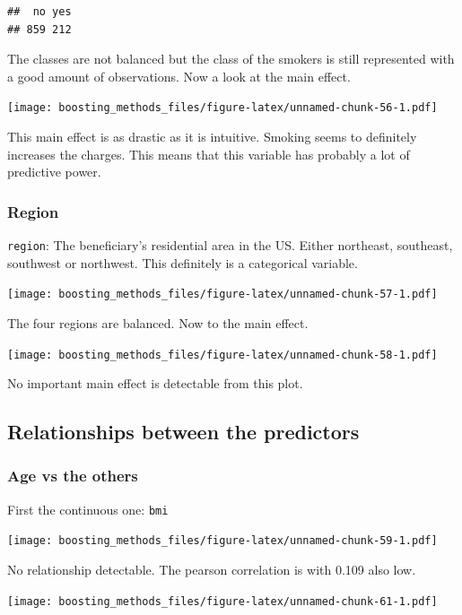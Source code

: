 \documentclass[
]{book}
\begin{document}
\begin{verbatim}
##  no yes 
## 859 212
\end{verbatim}

The classes are not balanced but the class of the smokers is still represented with a good amount of observations. Now a look at the main effect.

\texttt{[image: boosting\_methods\_files/figure-latex/unnamed-chunk-56-1.pdf]}

This main effect is as drastic as it is intuitive. Smoking seems to definitely increases the charges. This means that this variable has probably a lot of predictive power.

\hypertarget{region}{%
\subsubsection{Region}\label{region}}

\texttt{region}: The beneficiary's residential area in the US. Either northeast, southeast, southwest or northwest. This definitely is a categorical variable.

\texttt{[image: boosting\_methods\_files/figure-latex/unnamed-chunk-57-1.pdf]}

The four regions are balanced. Now to the main effect.

\texttt{[image: boosting\_methods\_files/figure-latex/unnamed-chunk-58-1.pdf]}

No important main effect is detectable from this plot.

\hypertarget{relationships-between-the-predictors-1}{%
\subsection{Relationships between the predictors}\label{relationships-between-the-predictors-1}}

\hypertarget{age-vs-the-others}{%
\subsubsection{Age vs the others}\label{age-vs-the-others}}

First the continuous one: \texttt{bmi}

\texttt{[image: boosting\_methods\_files/figure-latex/unnamed-chunk-59-1.pdf]}

No relationship detectable. The pearson correlation is with 0.109 also low.

\texttt{[image: boosting\_methods\_files/figure-latex/unnamed-chunk-61-1.pdf]}
\end{document}
